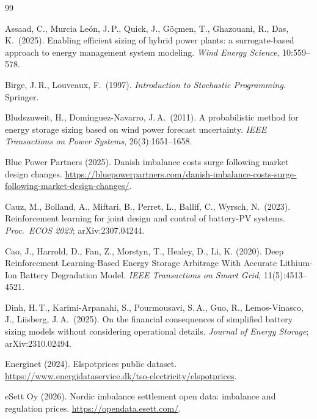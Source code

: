 \documentclass[11pt]{article}
\begin{document}

\begin{thebibliography}{99}

Assaad, C., Murcia Le\'{o}n, J.\,P., Quick, J., G\"{o}\c{c}men, T., Ghazouani, R., Das, K.\ (2025). Enabling efficient sizing of hybrid power plants: a surrogate-based approach to energy management system modeling. \emph{Wind Energy Science}, 10:559--578.

Birge, J.\,R., Louveaux, F.\ (1997). \emph{Introduction to Stochastic Programming}. Springer.

Bludszuweit, H., Dom\'{i}nguez-Navarro, J.\,A.\ (2011). A probabilistic method for energy storage sizing based on wind power forecast uncertainty. \emph{IEEE Transactions on Power Systems}, 26(3):1651--1658.

Blue Power Partners (2025). Danish imbalance costs surge following market design changes. \url{https://bluepowerpartners.com/danish-imbalance-costs-surge-following-market-design-changes/}.

Cauz, M., Bolland, A., Miftari, B., Perret, L., Ballif, C., Wyrsch, N.\ (2023). Reinforcement learning for joint design and control of battery-PV systems. \emph{Proc.\ ECOS 2023}; arXiv:2307.04244.

Cao, J., Harrold, D., Fan, Z., Morstyn, T., Healey, D., Li, K. (2020). Deep Reinforcement Learning-Based Energy Storage Arbitrage With Accurate Lithium-Ion Battery Degradation Model. \emph{IEEE Transactions on Smart Grid}, 11(5):4513--4521.

Dinh, H.\,T., Karimi-Arpanahi, S., Pourmousavi, S.\,A., Guo, R., Lemos-Vinasco, J., Liisberg, J.\,A.\ (2025). On the financial consequences of simplified battery sizing models without considering operational details. \emph{Journal of Energy Storage}; arXiv:2310.02494.

Energinet (2024). Elspotprices public dataset. \url{https://www.energidataservice.dk/tso-electricity/elspotprices}.

eSett Oy (2026). Nordic imbalance settlement open data: imbalance and regulation prices. \url{https://opendata.esett.com/}.


\end{thebibliography}
\end{document}
